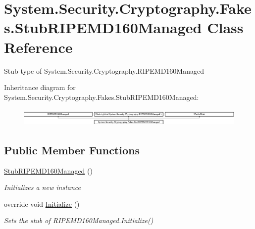 \hypertarget{class_system_1_1_security_1_1_cryptography_1_1_fakes_1_1_stub_r_i_p_e_m_d160_managed}{\section{System.\-Security.\-Cryptography.\-Fakes.\-Stub\-R\-I\-P\-E\-M\-D160\-Managed Class Reference}
\label{class_system_1_1_security_1_1_cryptography_1_1_fakes_1_1_stub_r_i_p_e_m_d160_managed}
}


Stub type of System.\-Security.\-Cryptography.\-R\-I\-P\-E\-M\-D160\-Managed 


Inheritance diagram for System.\-Security.\-Cryptography.\-Fakes.\-Stub\-R\-I\-P\-E\-M\-D160\-Managed\-:\begin{figure}[H]
\begin{center}
\leavevmode
\includegraphics[height=0.915033cm]{class_system_1_1_security_1_1_cryptography_1_1_fakes_1_1_stub_r_i_p_e_m_d160_managed}
\end{center}
\end{figure}
\subsection*{Public Member Functions}
\begin{DoxyCompactItemize}
\item 
\hyperlink{class_system_1_1_security_1_1_cryptography_1_1_fakes_1_1_stub_r_i_p_e_m_d160_managed_aac8d115712bb95775920761063dca883}{Stub\-R\-I\-P\-E\-M\-D160\-Managed} ()
\begin{DoxyCompactList}\small\item\em Initializes a new instance\end{DoxyCompactList}\item 
override void \hyperlink{class_system_1_1_security_1_1_cryptography_1_1_fakes_1_1_stub_r_i_p_e_m_d160_managed_a9205e9954511b164babf068e39897f36}{Initialize} ()
\begin{DoxyCompactList}\small\item\em Sets the stub of R\-I\-P\-E\-M\-D160\-Managed.\-Initialize()\end{DoxyCompactList}\end{DoxyCompactItemize}
